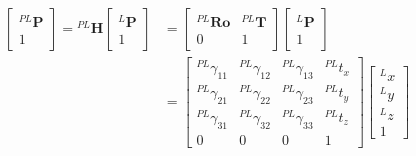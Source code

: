     \begin{equation}
        \label{eqn:homogeneous}
        \begin{aligned}
        {\left[\begin{array}{c}
        { }^{P L} \boldsymbol{P} \\
        1
        \end{array}\right]={ }^{P L} \boldsymbol{H}\left[\begin{array}{c}
        { }^{L} \boldsymbol{P} \\
        1
        \end{array}\right] } &=\left[\begin{array}{cc}
        { }^{P L} \boldsymbol{R} \boldsymbol{o} & { }^{P L} \boldsymbol{T} \\
        0 & 1
        \end{array}\right]\left[\begin{array}{c}
        { }^{L} \boldsymbol{P} \\
        1
        \end{array}\right] \\
        &=\left[\begin{array}{cccc}
        { }^{P L} \gamma_{11} & { }^{P L} \gamma_{12} & { }^{P L} \gamma_{13} & { }^{P L} {t}_{x} \\
        { }^{P L} \gamma_{21} & ^{P L } \gamma_{22} & { }^{P L} \gamma_{23} & { }^{P L} {t}_{y} \\
        { }^{P L} \gamma_{31} & ^{P L} \gamma_{32} & { }^{P L} \gamma_{33} & { }^{P L} {t}_{z} \\
        0 & 0 & 0 & 1
        \end{array}\right]\left[\begin{array}{c}
        { }^{L} {x} \\
        { }^{L} {y} \\
        { }^{L} z \\
        1
        \end{array}\right]
        \end{aligned}
    \end{equation}


